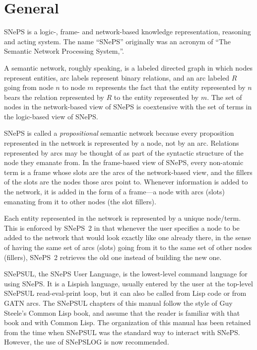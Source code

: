 \documentclass{book}
\begin{document}
\section{General}

SNePS is a logic-, frame- and network-based knowledge representation,
reasoning and acting system.  The name ``SNePS'' originally was an
acronym of ``The Semantic Network Processing System,''.

A semantic network, roughly speaking, is a labeled directed graph in which nodes
represent entities, arc labels represent binary relations, and an arc labeled
$R$ going from node $n$ to node $m$ represents the fact that the entity
represented by $n$ bears the relation represented by $R$ to the entity
represented by $m$.  The set of nodes in the network-based view of SNePS is
coextensive with the set of terms in the logic-based view of SNePS.

SNePS is called a {\em propositional} semantic network because every proposition
represented in the network is represented by a node, not by an arc.  Relations
represented by arcs may be thought of as part of the syntactic structure of the
node they emanate from.  In the frame-based view of SNePS, every non-atomic term
is a frame whose slots are the arcs of the network-based view, and the fillers
of the slots are the nodes those arcs point to.  Whenever information is added
to the network, it is added in the form of a frame---a node with arcs (slots)
emanating from it to other nodes (the slot fillers).

Each entity represented in the network is represented by a unique node/term.
This is enforced by SNePS~2 in that whenever the user specifies a node to be
added to the network that would look exactly like one already there, in the
sense of having the same set of arcs (slots) going from it to the same set of
other nodes (fillers), SNePS~2 retrieves the old one instead of building the new
one.

SNePSUL, the SNePS User Language, is the lowest-level command language
for using SNePS.  It is a Lispish language, usually entered by the
user at the top-level SNePSUL read-eval-print loop, but it can also be
called from Lisp code or from GATN arcs.  The SNePSUL chapters of this
manual follow the style of Guy Steele's {\sc Common Lisp} book, and
assume that the reader is familiar with that book and with {\sc Common
  Lisp.}  The organization of this manual has been retained from the
time when SNePSUL was the standard way to interact with SNePS.
However, the use of SNePSLOG is now recommended.
\end{document}
